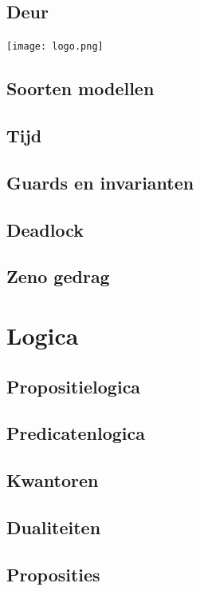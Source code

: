 \documentclass{article}
\begin{document}
	\subsection{Deur}	
	\texttt{[image: logo.png]} %
	
	\subsection{Soorten modellen}
	
	\subsection{Tijd}
	
	\subsection{Guards en invarianten}
	
	\subsection{Deadlock}
	
	\subsection{Zeno gedrag}
	
	\section{Logica}
	
	\subsection{Propositielogica}
	
	\subsection{Predicatenlogica}
	
	\subsection{Kwantoren}
	
	\subsection{Dualiteiten}
	
	\subsection{Proposities}
	
\end{document}
